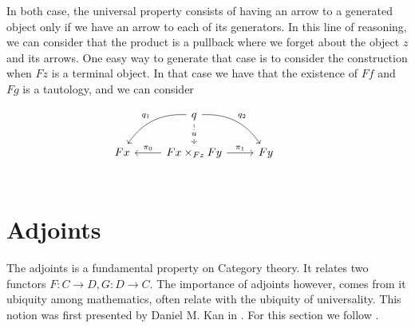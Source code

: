 In both case, the universal property consists of having an arrow to a generated object only if we have an arrow to each of its generators. In this line of reasoning, we can consider that the product is a pullback where we forget about the object $z$ and its arrows. One easy way to generate that case is to consider the construction when $Fz$ is a terminal object. In that case we have that the existence of $Ff$ and $Fg$ is a tautology, and we can consider 

\[
\begin{tikzcd}
& q
\arrow[bend left]{dr}{q_2}
\arrow[bend right,swap]{dl}{q_1}
\arrow[dashed]{d}[description]{u} & & \\
 Fx  & Fx\times_{Fz}Fy \arrow{r}{\pi_1} \arrow{l}[swap]{\pi_0}& Fy \\
\end{tikzcd}
\]








\section{Adjoints}

The adjoints is a fundamental property on Category theory. It relates two functors $F:C\to D, G:D\to C$. The importance of adjoints however, comes from it ubiquity among mathematics, often relate with the ubiquity of universality. This notion was first presented by Daniel M. Kan in \cite{kan1958adjoint}. For this section we follow \cite{mac2013categories}.\\

